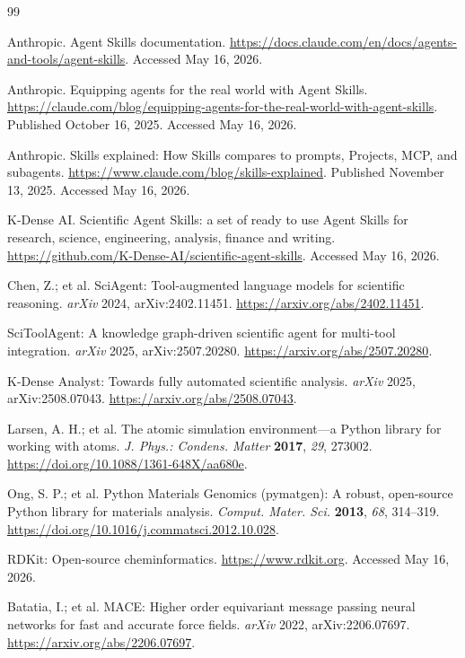 \documentclass[11pt]{article}
\begin{document}
\begin{thebibliography}{99}

Anthropic. Agent Skills documentation. \url{https://docs.claude.com/en/docs/agents-and-tools/agent-skills}. Accessed May 16, 2026.

Anthropic. Equipping agents for the real world with Agent Skills. \url{https://claude.com/blog/equipping-agents-for-the-real-world-with-agent-skills}. Published October 16, 2025. Accessed May 16, 2026.

Anthropic. Skills explained: How Skills compares to prompts, Projects, MCP, and subagents. \url{https://www.claude.com/blog/skills-explained}. Published November 13, 2025. Accessed May 16, 2026.

K-Dense AI. Scientific Agent Skills: a set of ready to use Agent Skills for research, science, engineering, analysis, finance and writing. \url{https://github.com/K-Dense-AI/scientific-agent-skills}. Accessed May 16, 2026.

Chen, Z.; et al. SciAgent: Tool-augmented language models for scientific reasoning. \emph{arXiv} 2024, arXiv:2402.11451. \url{https://arxiv.org/abs/2402.11451}.

SciToolAgent: A knowledge graph-driven scientific agent for multi-tool integration. \emph{arXiv} 2025, arXiv:2507.20280. \url{https://arxiv.org/abs/2507.20280}.

K-Dense Analyst: Towards fully automated scientific analysis. \emph{arXiv} 2025, arXiv:2508.07043. \url{https://arxiv.org/abs/2508.07043}.

Larsen, A. H.; et al. The atomic simulation environment---a Python library for working with atoms. \emph{J. Phys.: Condens. Matter} \textbf{2017}, \emph{29}, 273002. \url{https://doi.org/10.1088/1361-648X/aa680e}.

Ong, S. P.; et al. Python Materials Genomics (pymatgen): A robust, open-source Python library for materials analysis. \emph{Comput. Mater. Sci.} \textbf{2013}, \emph{68}, 314--319. \url{https://doi.org/10.1016/j.commatsci.2012.10.028}.

RDKit: Open-source cheminformatics. \url{https://www.rdkit.org}. Accessed May 16, 2026.

Batatia, I.; et al. MACE: Higher order equivariant message passing neural networks for fast and accurate force fields. \emph{arXiv} 2022, arXiv:2206.07697. \url{https://arxiv.org/abs/2206.07697}.


\end{thebibliography}
\end{document}
